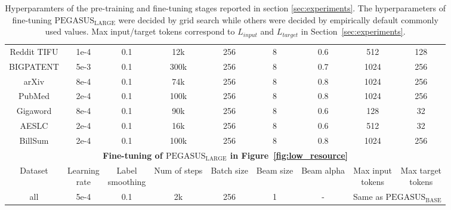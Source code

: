 \begin{table}[htb!]
\begin{tabular}{ccccccccc}
    Reddit TIFU     & 1e-4  & 0.1 & 12k     & 256   & 8 & 0.6   & 512   & 128   \\
    BIGPATENT       & 5e-3  & 0.1 & 300k    & 256   & 8 & 0.7     & 1024  & 256   \\
    arXiv           & 8e-4  & 0.1 & 74k     & 256   & 8 & 0.8   & 1024  & 256   \\
    PubMed          & 2e-4  & 0.1 & 100k    & 256   & 8 & 0.8   & 1024  & 256   \\
    Gigaword        & 8e-4  & 0.1 & 90k     & 256   & 8 & 0.6   & 128   & 32    \\
    AESLC           & 2e-4  & 0.1 & 16k     & 256   & 8 & 0.6   & 512   & 32    \\
    BillSum         & 2e-4  & 0.1 & 100k    & 256   & 8 & 0.8   & 1024  & 256   \\\hline
    \multicolumn{9}{c}{\textbf{Fine-tuning of $\text{PEGASUS}_{\text{LARGE}}$ in Figure~\ref{fig:low_resource} }}\\\hline
    Dataset & \makecell{Learning \\ rate} & \makecell{Label \\ smoothing} & Num of steps & Batch size & Beam size & Beam alpha & \makecell{Max input\\tokens} & \makecell{Max target\\tokens}\\\hline
    all   & 5e-4 & 0.1 & 2k & 256 & 1 & - & \multicolumn{2}{c}{Same as $\text{PEGASUS}_{\text{BASE}}$} \\\hline
  \end{tabular}
  \caption{Hyperparamters of the pre-training and fine-tuning stages reported in section \ref{sec:experiments}. The hyperparameters of fine-tuning $\text{PEGASUS}_{\text{LARGE}}$ were decided by grid search while others were decided by empirically default commonly used values. Max input/target tokens correspond to $L_{input}$ and $L_{target}$ in Section~\ref{sec:experiments}.
  }
  \label{tab:hyperparamters}
\end{table}
